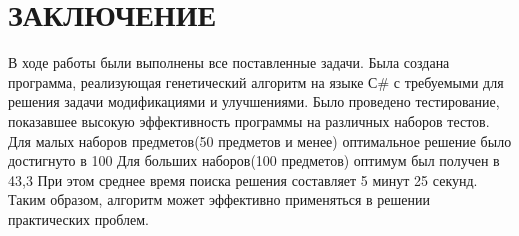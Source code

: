 \chapter*{ЗАКЛЮЧЕНИЕ}
В ходе работы были выполнены все поставленные задачи. Была создана программа, реализующая генетический алгоритм на языке С\# с требуемыми для решения задачи модификациями и улучшениями.
Было проведено тестирование, показавшее высокую эффективность программы на различных наборов тестов.
Для малых наборов предметов(50 предметов и менее) оптимальное решение было достигнуто в 100%
Для больших наборов(100 предметов) оптимум был получен в 43,3%
При этом среднее время поиска решения составляет 5 минут 25 секунд. 
Таким образом, алгоритм может эффективно применяться в решении практических проблем.

